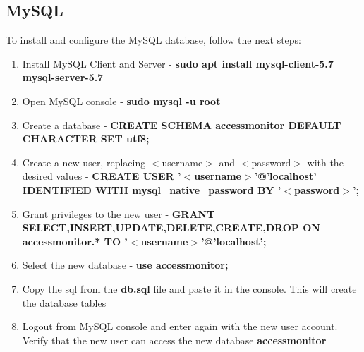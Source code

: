 \subsection{MySQL}

To install and configure the MySQL database, follow the next steps:

\begin{enumerate}
    \item Install MySQL Client and Server - \textbf{sudo apt install mysql-client-5.7 mysql-server-5.7}
    \item Open MySQL console - \textbf{sudo mysql -u root}
    \item Create a database - \textbf{CREATE SCHEMA accessmonitor DEFAULT CHARACTER SET utf8;}
    \item Create a new user, replacing $<$username$>$ and $<$password$>$ with the desired values - \textbf{CREATE USER '$<$username$>$'@'localhost'
IDENTIFIED WITH mysql\_native\_password BY '$<$password$>$';}
    \item Grant privileges to the new user - \newline \textbf{GRANT SELECT,INSERT,UPDATE,DELETE,CREATE,DROP ON accessmonitor.* TO '$<$username$>$'@'localhost';}
    \item Select the new database - \textbf{use accessmonitor;}
    \item Copy the sql from the \textbf{db.sql} file and paste it in the console. This will create the database tables
    \item Logout from MySQL console and enter again with the new user account. Verify that the new user can access the new database \textbf{accessmonitor}
\end{enumerate}